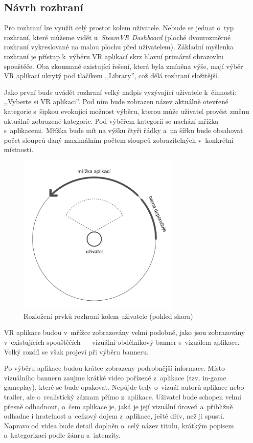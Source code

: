 \subsection{Návrh rozhraní}\label{nuxe1vrh-rozhranuxed}

Pro rozhraní lze využít celý prostor kolem uživatele. Nebude se jednat
o~typ rozhraní, které můžeme vidět u~\emph{SteamVR Dashboard} (ploché
dvourozměrné rozhraní vykreslované na malou plochu před uživatelem).
Základní myšlenka rozhraní je přístup k~výběru VR aplikací skrz hlavní
primární obrazovku spouštěče. Oba zkoumané existující řešení, která byla
zmíněna výše, mají výběr VR aplikací ukrytý pod tlačíkem ,,Library'',
což dělá rozhraní složitější.

Jako první bude uvádět rozhraní velký nadpis vyzývající uživatele
k~činnosti: ,,Vyberte si VR aplikaci''. Pod ním bude zobrazen název
aktuálně otevřené kategorie s~šipkou evokující možnost výběru, kterou
může uživatel provést změnu aktuálně zobrazené kategorie. Pod výběřem
kategorií se nachází mřížka s~aplikacemi. Mřížka bude mít na výšku čtyři
řádky a~na šířku bude obsahovat počet sloupců daný maximálním
počtem sloupců zobrazitelných v~konkrétní místnosti.

\begin{figure}[h!]
\centering
\includegraphics[height=8cm]{src/assets/wireframe-topdown-arrangement.pdf}
\caption{Rozložení prvků rozhraní kolem uživatele (pohled shora)}
\end{figure}

VR aplikace budou v~mřížce zobrazovány velmi podobně, jako jsou
zobrazovány v~existujících spouštěčích --- vizuální obdélníkový banner
s~vizuálem aplikace. Velký rozdíl se však projeví při výběru banneru.

Po výběru aplikace budou krátce zobrazeny podrobnější informace. Místo vizuálního banneru zaujme
krátké video pořízené z~aplikace (tzv. in-game gameplay), které se bude
opakovat. Nepůjde tedy o~vizuál autorů aplikace nebo trailer, ale
o~realistický záznam přímo z~aplikace. Uživatel bude schopen velmi přesně
odhadnout, o~čem aplikace je, jaká je její vizuální úroveň a~přibližně
odhadne i hratelnost a~celkový dojem z~aplikace, ještě dřív, než ji
spustí. Napravo od videa bude detail doplněn o~celý název titulu,
krátkým popisem a~kategorizací podle žánru a~intenzity. 

